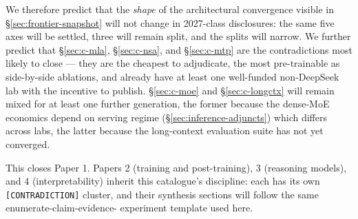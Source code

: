 We therefore predict that the \emph{shape} of the architectural
convergence visible in \S\ref{sec:frontier-snapshot} will not change in
2027-class disclosures: the same five axes will be settled, three will
remain split, and the splits will narrow. We further predict that
\S\ref{sec:c-mla}, \S\ref{sec:c-nsa}, and \S\ref{sec:c-mtp} are the
contradictions most likely to close --- they are the cheapest to
adjudicate, the most pre-trainable as side-by-side ablations, and
already have at least one well-funded non-DeepSeek lab with the
incentive to publish. \S\ref{sec:c-moe} and \S\ref{sec:c-longctx} will
remain mixed for at least one further generation, the former because
the dense-MoE economics depend on serving regime
(\S\ref{sec:inference-adjuncts}) which differs across labs, the latter
because the long-context evaluation suite has not yet converged.

This closes Paper 1. Papers 2 (training and post-training), 3
(reasoning models), and 4 (interpretability) inherit this catalogue's
discipline: each has its own \texttt{[CONTRADICTION]} cluster, and
their synthesis sections will follow the same enumerate-claim-evidence-
experiment template used here.
